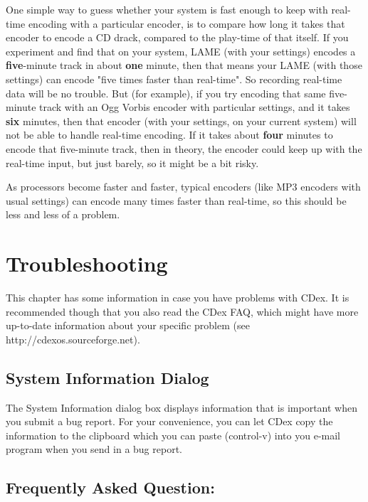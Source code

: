 One simple way to guess whether your system is fast enough to keep with real-time
encoding with a particular encoder, is to compare how long it takes that encoder
to encode a CD drack, compared to the play-time of that itself.  If you experiment and
find that on your system, LAME (with your settings) encodes a {\bf five}-minute track in
about {\bf one} minute, then that means your LAME (with those settings) can encode
"five times faster than real-time".  So recording real-time data will be no trouble.
But (for example), if you try encoding that same five-minute track with an Ogg Vorbis
encoder with particular settings, and it takes {\bf six} minutes, then that encoder
(with your settings, on your current system) will not be able to handle real-time
encoding.  If it takes about {\bf four} minutes to encode that five-minute track, then
in theory, the encoder could keep up with the real-time input, but just barely,
so it might be a bit risky.

As processors become faster and faster, typical encoders (like MP3 encoders with
usual settings) can encode many times faster than real-time, so this should be
less and less of a problem.


\chapter{Troubleshooting}
\setfooter{\thepage}{}{}{}{}{\thepage}

This chapter has some information in case you have problems with CDex. It is
recommended though that you also read the CDex FAQ, which might have more
up-to-date information about your specific problem (see http://cdexos.sourceforge.net).


\section{System Information Dialog}\label{systeminfo}

The System Information dialog box displays information that is important
when you submit a bug report. For your convenience, you can let CDex copy
the information to the clipboard which you can paste (control-v) into you
e-mail program when you send in a bug report.


\section{Frequently Asked Question:}


